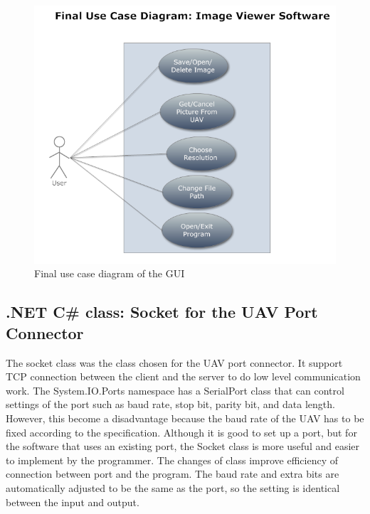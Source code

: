 \begin{figure}[!hbtp]
\begin{center}
\includegraphics[scale=0.7]{figures/FinaluserCase.png} 
\end{center}
\caption{Final use case diagram of the GUI\label{GUI_finalUseCase}}
\end{figure}

\subsection{.NET C\# class: Socket for the UAV Port Connector}
The socket class was the class chosen for the UAV port connector. 
It support TCP connection between the client and the server to do low level communication work\cite{xiaX}. 
The System.IO.Ports namespace has a SerialPort class that can control settings of the port such as baud rate, stop bit, parity bit, and data length.
However, this become a disadvantage because the baud rate of the UAV has to be fixed according to the specification. 
Although it is good to set up a port, but for the software that uses an existing port, the Socket class is more useful and easier to implement by the programmer. 
The changes of class improve efficiency of connection between port and the program. 
The baud rate and extra bits are automatically adjusted to be the same as the port, so the setting is identical between the input and output.